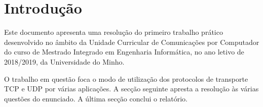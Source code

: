 
\section*{Introdução}

Este documento apresenta uma resolução do primeiro trabalho prático desenvolvido no âmbito da Unidade Curricular de Comunicações por Computador do curso de Mestrado Integrado em Engenharia Informática, no ano letivo de 2018/2019, da Universidade do Minho.

O trabalho em questão foca o modo de utilização dos protocolos de transporte TCP e UDP por várias aplicações. A secção seguinte apresta a resolução às várias questões do enunciado. A última secção conclui o relatório.


